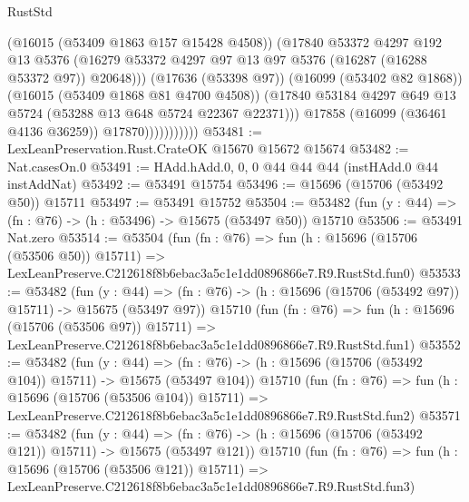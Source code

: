 \begin{lexlean}{RustStd}
\begin{coremodule}
                              (@16015 (@53409 @1863 @157 @15428 @4508))
                              (@17840
                                @53372
                                @4297
                                @192
                                @13
                                @5376
                                (@16279
                                  @53372
                                  @4297
                                  @97
                                  @13
                                  @97
                                  @5376
                                  (@16287 (@16288 @53372 @97))
                                  @20648)))
                            (@17636 (@53398 @97))
                            (@16099 (@53402 @82 @1868))
                            (@16015 (@53409 @1868 @81 @4700 @4508))
                            (@17840
                              @53184
                              @4297
                              @649
                              @13
                              @5724
                              (@53288 @13 @648 @5724 @22367 @22371)))
                          @17858
                          (@16099 (@36461 @4136 @36259))
                          @17870)))))))))))
@53481 := LexLeanPreservation.Rust.CrateOK @15670 @15672 @15674
@53482 := Nat.casesOn.{0}
@53491 := HAdd.hAdd.{0, 0, 0} @44 @44 @44 (instHAdd.{0} @44 instAddNat)
@53492 := @53491 @15754
@53496 := @15696 (@15706 (@53492 @50)) @15711
@53497 := @53491 @15752
@53504 := @53482 (fun (y : @44) => (fn : @76) -> (h : @53496) -> @15675 (@53497 @50)) @15710
@53506 := @53491 Nat.zero
@53514 := @53504
    (fun (fn : @76) =>
    fun (h : @15696 (@15706 (@53506 @50)) @15711) =>
    LexLeanPreserve.C212618f8b6ebac3a5c1e1dd0896866e7.R9.RustStd.fun0)
@53533 := @53482
    (fun (y : @44) =>
    (fn : @76) -> (h : @15696 (@15706 (@53492 @97)) @15711) -> @15675 (@53497 @97))
    @15710
    (fun (fn : @76) =>
    fun (h : @15696 (@15706 (@53506 @97)) @15711) =>
    LexLeanPreserve.C212618f8b6ebac3a5c1e1dd0896866e7.R9.RustStd.fun1)
@53552 := @53482
    (fun (y : @44) =>
    (fn : @76) -> (h : @15696 (@15706 (@53492 @104)) @15711) -> @15675 (@53497 @104))
    @15710
    (fun (fn : @76) =>
    fun (h : @15696 (@15706 (@53506 @104)) @15711) =>
    LexLeanPreserve.C212618f8b6ebac3a5c1e1dd0896866e7.R9.RustStd.fun2)
@53571 := @53482
    (fun (y : @44) =>
    (fn : @76) -> (h : @15696 (@15706 (@53492 @121)) @15711) -> @15675 (@53497 @121))
    @15710
    (fun (fn : @76) =>
    fun (h : @15696 (@15706 (@53506 @121)) @15711) =>
    LexLeanPreserve.C212618f8b6ebac3a5c1e1dd0896866e7.R9.RustStd.fun3)

\end{coremodule}
\end{lexlean}
